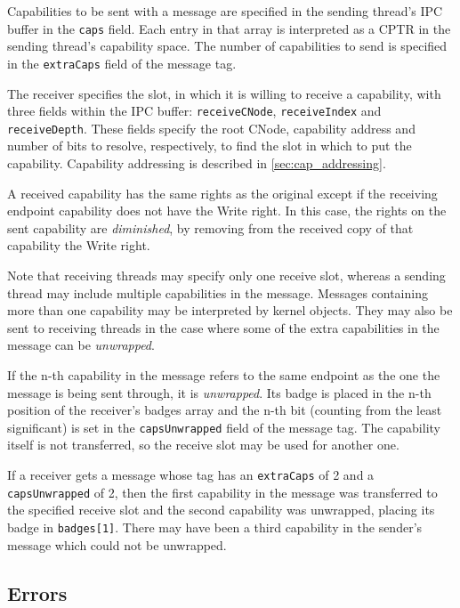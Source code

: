Capabilities to be sent with a message are specified in the sending thread's
IPC buffer in the \texttt{caps} field. Each entry in that array is interpreted
as a CPTR in the sending thread's capability space. The number of capabilities
to send is specified in the \texttt{extraCaps} field of the message tag.

The receiver specifies the slot,
in which it is willing to receive a capability, with three fields within the IPC buffer: \texttt{receiveCNode}, \texttt{receiveIndex} and \texttt{receiveDepth}.
These fields specify the root CNode, capability address and number of bits to resolve, respectively, to find
the slot in which to put the capability. Capability
addressing is described in \autoref{sec:cap_addressing}.

A received capability has the same rights as the original except if the receiving endpoint capability does not have the Write right.
In this case, the rights on the sent capability are \emph{diminished}, by
removing from the received copy of that capability the Write right.

Note that receiving threads may specify only one receive slot, whereas a
sending thread may include multiple capabilities in the message. Messages
containing more than one capability may be interpreted by kernel objects. They
may also be sent to receiving threads in the case where some of the extra
capabilities in the message can be \emph{unwrapped}.

If the n-th capability in the message refers to the same endpoint as the one
the
message is being sent through, it is \emph{unwrapped}. Its badge is placed in
the n-th
position of the receiver's badges array and the n-th bit (counting from the
least significant) is set in the \texttt{capsUnwrapped} field of the message
tag. The capability itself is not transferred, so the receive slot may be used
for another one.

If a receiver gets a message whose tag has an \texttt{extraCaps} of 2 and a
\texttt{capsUnwrapped} of 2, then the first capability in the message was
transferred to the specified receive slot and the second capability was
unwrapped, placing its badge in \texttt{badges[1]}. There may have been a
third capability in the sender's message which could not be unwrapped.

\subsection{Errors}


